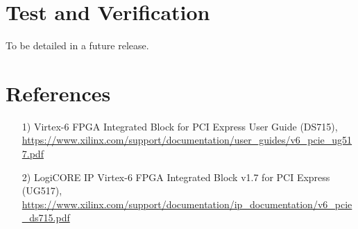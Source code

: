 \documentclass{article}
\begin{document}
\section*{Test and Verification}
\begin{flushleft}
 To be detailed in a future release.
\end{flushleft}
\section*{References}
\begin{flushleft}
	\begin{itemize}
		\item[1)] Virtex-6 FPGA Integrated Block for PCI Express User Guide (DS715), \url{https://www.xilinx.com/support/documentation/user_guides/v6_pcie_ug517.pdf} \\
		\item[2)] LogiCORE IP Virtex-6 FPGA Integrated Block v1.7 for PCI Express (UG517), \url{https://www.xilinx.com/support/documentation/ip_documentation/v6_pcie_ds715.pdf}
	\end{itemize}
\end{flushleft}
\end{document}
